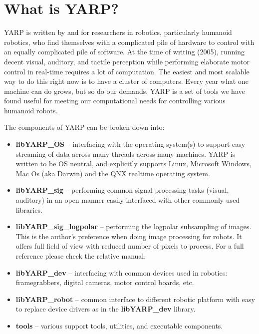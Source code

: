 
\section{What is YARP?}

YARP is written by and for researchers in robotics, particularly
humanoid robotics, who find themselves with a complicated pile of
hardware to control with an equally complicated pile of software. 
At the time of writing (2005), running decent visual, auditory, and
tactile perception while performing elaborate motor control in
real-time requires a lot of computation.  The easiest and most
scalable way to do this right now is to have a cluster of computers.
Every year what one machine can do grows, but so do our demands.  YARP
is a set of tools we have found useful for meeting our computational
needs for controlling various humanoid robots. 

The components of YARP can be broken down into:

\begin{itemize}

\item {\bf libYARP\_OS} -- interfacing with the operating system(s)
to support easy streaming of data across many threads across many
machines.  YARP is written to be OS neutral, and explicitly supports
Linux, Microsoft Windows, Mac Os (aka Darwin) and the QNX realtime operating system.

\item {\bf libYARP\_sig} -- performing common signal processing tasks
(visual, auditory) in an open manner easily interfaced with other
commonly used libraries.

\item {\bf libYARP\_sig\_logpolar} -- performing the logpolar subsampling of images. This is the author's preference when doing image processing for robots. It offers full field of view with reduced number of pixels to process. For a full reference please check the relative manual.

\item {\bf libYARP\_dev} -- interfacing with common devices used in robotics:
framegrabbers, digital cameras, motor control boards, etc.

\item {\bf libYARP\_robot} -- common interface to different robotic platform with easy to replace device drivers as in the {\bf libYARP\_dev} library.

\item {\bf tools} -- various support tools, utilities, and executable components.

\end{itemize}

